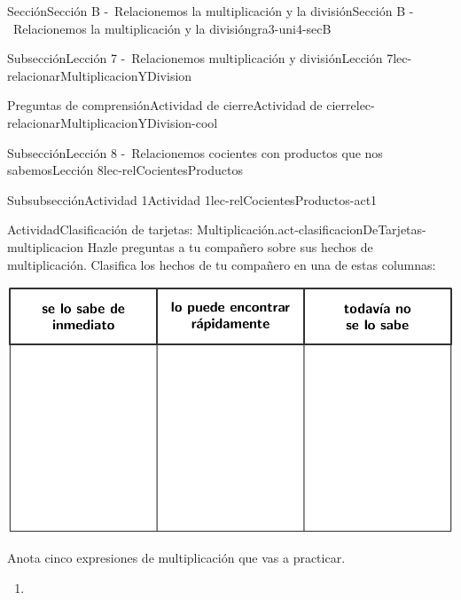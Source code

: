 \begin{sectionptx}{Sección}{Sección B -~Relacionemos la multiplicación y la división}{}{Sección B -~Relacionemos la multiplicación y la división}{}{}{gra3-uni4-secB}
\begin{subsectionptx}{Subsección}{Lección 7 -~Relacionemos multiplicación y división}{}{Lección 7}{}{}{lec-relacionarMultiplicacionYDivision}
%
%
\typeout{************************************************}
\typeout{************************************************}
%
\begin{reading-questions-subsubsection}{Preguntas de comprensión}{Actividad de cierre}{}{Actividad de cierre}{}{}{lec-relacionarMultiplicacionYDivision-cool}
%
\end{reading-questions-subsubsection}
\end{subsectionptx}
%
%
\typeout{************************************************}
\typeout{************************************************}
%
\begin{subsectionptx}{Subsección}{Lección 8 -~Relacionemos cocientes con productos que nos sabemos}{}{Lección 8}{}{}{lec-relCocientesProductos}
%
%
\typeout{************************************************}
\typeout{************************************************}
%
\begin{subsubsectionptx}{Subsubsección}{Actividad 1}{}{Actividad 1}{}{}{lec-relCocientesProductos-act1}
\begin{activity}{Actividad}{Clasificación de tarjetas: Multiplicación.}{act-clasificacionDeTarjetas-multiplicacion}%
Hazle preguntas a tu compañero sobre sus hechos de multiplicación. Clasifica los hechos de tu compañero en una de estas columnas:%
\begin{image}{0}{1}{0}{}%
\includegraphics[max width=\linewidth, center]{external/tikz-source/clasificacionTarjetas-mult-paraBLM.pdf}
\end{image}%
Anota cinco expresiones de multiplicación que vas a practicar.%
%
\begin{enumerate}
\item{\vspace{0.5cm}}%

\end{enumerate}
\end{activity}
\end{subsubsectionptx}
\end{subsectionptx}
\end{sectionptx}
